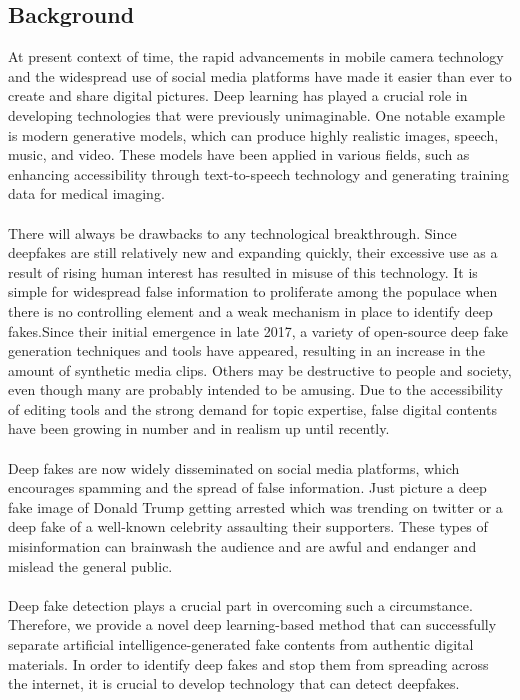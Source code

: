 \subsection{Background}
At present context of time, the rapid advancements in mobile camera technology and the widespread use of social media platforms have made it easier than ever to create and share digital pictures. Deep learning has played a crucial role in developing technologies that were previously unimaginable. One notable example is modern generative models, which can produce highly realistic images, speech, music, and video. These models have been applied in various fields, such as enhancing accessibility through text-to-speech technology and generating training data for medical imaging.
\\
\\
There will always be drawbacks to any technological breakthrough. Since deepfakes are still relatively new and expanding quickly, their excessive use as a result of rising human interest has resulted in misuse of this technology. It is simple for widespread false information to proliferate among the populace when there is no controlling element and a weak mechanism in place to identify deep fakes.Since their initial emergence in late 2017, a variety of open-source deep fake generation techniques and tools have appeared, resulting in an increase in the amount of synthetic media clips. Others may be destructive to people and society, even though many are probably intended to be amusing. Due to the accessibility of editing tools and the strong demand for topic expertise, false digital contents have been growing in number and in realism up until recently.
\\
\\
Deep fakes are now widely disseminated on social media platforms, which encourages spamming and the spread of false information. Just picture a deep fake image of Donald Trump getting arrested which was trending on twitter or a deep fake of a well-known celebrity assaulting their supporters.
These types of misinformation can brainwash the audience and are awful and endanger and mislead the general public.
\\
\\
Deep fake detection plays a crucial part in overcoming such a circumstance. Therefore, we provide a novel deep learning-based method that can successfully separate artificial intelligence-generated fake contents from authentic digital materials. In order to identify deep fakes and stop them from spreading across the internet, it is crucial to develop technology that can detect deepfakes.